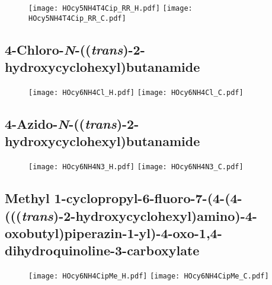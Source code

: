 \begin{figure}[H]
	\centering
		\texttt{[image: HOcy5NH4T4Cip\_RR\_H.pdf]}
		\texttt{[image: HOcy5NH4T4Cip\_RR\_C.pdf]}
\end{figure}

\subsection{4\hyp{}Chloro\hyp{}\textit{N}\hyp{}((\textit{trans})\hyp{}2\hyp{}hydroxycyclohexyl)butanamide  }

\begin{figure}[H]
	\centering
		\texttt{[image: HOcy6NH4Cl\_H.pdf]}
		\texttt{[image: HOcy6NH4Cl\_C.pdf]}
\end{figure}

\subsection{4\hyp{}Azido\hyp{}\textit{N}\hyp{}((\textit{trans})\hyp{}2\hyp{}hydroxycyclohexyl)butanamide  }

\begin{figure}[H]
	\centering
		\texttt{[image: HOcy6NH4N3\_H.pdf]}
		\texttt{[image: HOcy6NH4N3\_C.pdf]}
\end{figure}

\subsection{Methyl 1\hyp{}cyclopropyl\hyp{}6\hyp{}fluoro\hyp{}7\hyp{}(4\hyp{}(4\hyp{}(((\textit{trans})\hyp{}2\hyp{}hydroxycyclohexyl)amino)\hyp{}4\hyp{}oxobutyl)piperazin\hyp{}1\hyp{}yl)\hyp{}4\hyp{}oxo\hyp{}1,4\hyp{}dihydroquinoline\hyp{}3\hyp{}carboxylate }

\begin{figure}[H]
	\centering
		\texttt{[image: HOcy6NH4CipMe\_H.pdf]}
		\texttt{[image: HOcy6NH4CipMe\_C.pdf]}
\end{figure}

